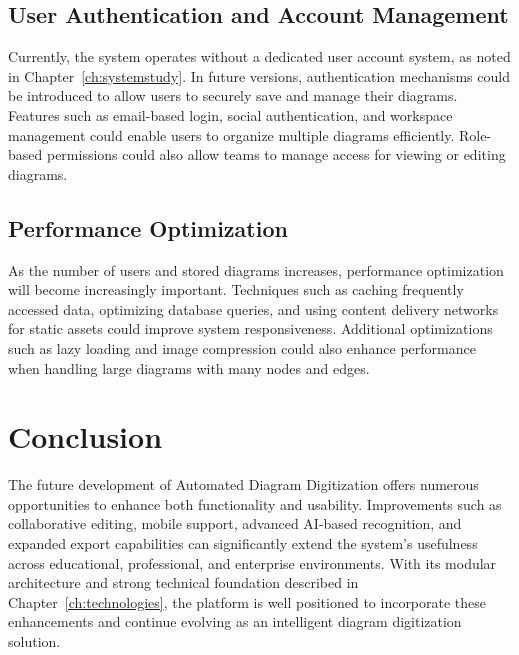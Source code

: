 \subsection{User Authentication and Account Management}
\label{subsec:auth}

Currently, the system operates without a dedicated user account 
system, as noted in Chapter~\ref{ch:systemstudy}. In future 
versions, authentication mechanisms could be introduced to 
allow users to securely save and manage their diagrams. Features 
such as email-based login, social authentication, and workspace 
management could enable users to organize multiple diagrams 
efficiently. Role-based permissions could also allow teams to 
manage access for viewing or editing 
diagrams.

\subsection{Performance Optimization}
\label{subsec:perf-optimization}

As the number of users and stored diagrams increases, 
performance optimization will become increasingly important. 
Techniques such as caching frequently accessed data, optimizing 
database queries, and using content delivery networks for static 
assets could improve system responsiveness. Additional 
optimizations such as lazy loading and image compression could 
also enhance performance when handling large diagrams with many 
nodes and edges.

\section{Conclusion}
\label{sec:future-conclusion}

The future development of Automated Diagram Digitization offers 
numerous opportunities to enhance both functionality and 
usability. Improvements such as collaborative editing, mobile 
support, advanced AI-based recognition, and expanded export 
capabilities can significantly extend the system's usefulness 
across educational, professional, and enterprise environments. 
With its modular architecture and strong technical foundation 
described in Chapter~\ref{ch:technologies}, the platform is 
well positioned to incorporate these enhancements and continue 
evolving as an intelligent diagram digitization 
solution.